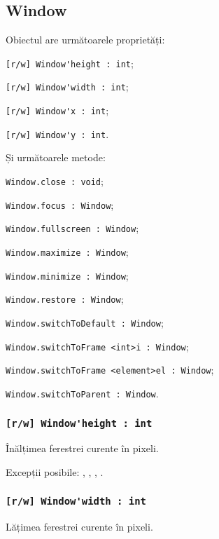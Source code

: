 \subsection{{\color{orange} Window}}

Obiectul \window{} are următoarele proprietăți:
\begin{icItems}
	\item \lstinline|[r/w] Window'height : int|;
	\item \lstinline|[r/w] Window'width : int|;
	\item \lstinline|[r/w] Window'x : int|;
	\item \lstinline|[r/w] Window'y : int|.
\end{icItems}

Și următoarele metode:
\begin{icItems}
	\item \lstinline|Window.close : void|;
	\item \lstinline|Window.focus : Window|;
	\item \lstinline|Window.fullscreen : Window|;
	\item \lstinline|Window.maximize : Window|;
	\item \lstinline|Window.minimize : Window|;
	\item \lstinline|Window.restore : Window|;
	\item \lstinline|Window.switchToDefault : Window|;
	\item \lstinline|Window.switchToFrame <int>i : Window|;
	\item \lstinline|Window.switchToFrame <element>el : Window|;
	\item \lstinline|Window.switchToParent : Window|.
\end{icItems}

\subsubsection{\lstinline|[r/w] Window'height : int|}

Înălțimea ferestrei curente în pixeli.

Excepții posibile: , , , .

\subsubsection{\lstinline|[r/w] Window'width : int|}

Lățimea ferestrei curente în pixeli.


